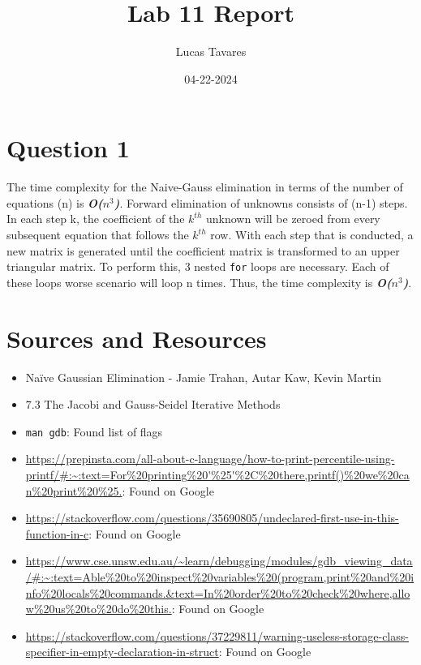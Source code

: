 \documentclass{article}
\title{Lab 11 Report}
\date{04-22-2024}
\author{Lucas Tavares}
\begin{document}
\maketitle


\newpage

\section{Question 1}

The time complexity for the Naive-Gauss elimination in terms of the number of equations (n) is \textbf{\textit{O($n^3$)}}. Forward elimination of unknowns consists of (n-1) steps. In each step k, the coefficient of the $k^{th}$ unknown will be zeroed from every subsequent equation that follows the $k^{th}$ row. With each step that is conducted, a new matrix is generated until the coefficient matrix is transformed to an upper triangular matrix. To perform this, 3 nested \texttt{for} loops are necessary. Each of these loops worse scenario will loop n times. Thus, the time complexity is \textbf{\textit{O($n^3$)}}.


\newpage

\section{Sources and Resources}

\begin{flushleft}
  \begin{itemize}
  \item{Naïve Gaussian Elimination - Jamie Trahan, Autar Kaw, Kevin Martin}
  \item{7.3 The Jacobi and Gauss-Seidel Iterative Methods}
  \item{\texttt{man gdb}: Found list of flags}
  \item{\url{https://prepinsta.com/all-about-c-language/how-to-print-percentile-using-printf/#:~:text=For%20printing%20'%25'%2C%20there,printf()%20we%20can%20print%20%25.}: Found on Google}
  \item{\url{https://stackoverflow.com/questions/35690805/undeclared-first-use-in-this-function-in-c}: Found on Google}
  \item{\url{https://www.cse.unsw.edu.au/~learn/debugging/modules/gdb_viewing_data/#:~:text=Able%20to%20inspect%20variables%20(program,print%20and%20info%20locals%20commands.&text=In%20order%20to%20check%20where,allow%20us%20to%20do%20this.}: Found on Google}
  \item{\url{https://stackoverflow.com/questions/37229811/warning-useless-storage-class-specifier-in-empty-declaration-in-struct}: Found on Google}
  \end{itemize}
\end{flushleft}
\end{document}
